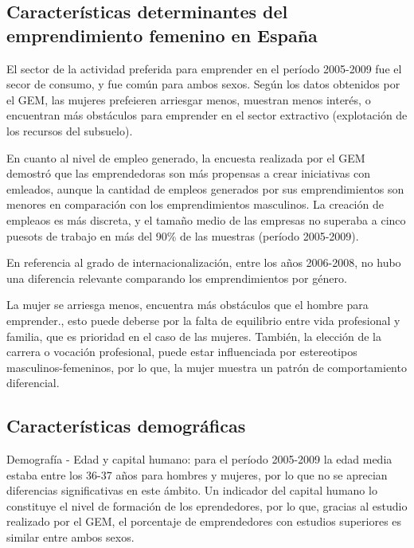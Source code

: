\documentclass[
  letterpaper,
  DIV=11,
  numbers=noendperiod]{scrreprt}
\begin{document}
\hypertarget{caracteruxedsticas-determinantes-del-emprendimiento-femenino-en-espauxf1a}{%
\subsection{Características determinantes del emprendimiento femenino en
España}\label{caracteruxedsticas-determinantes-del-emprendimiento-femenino-en-espauxf1a}}

El sector de la actividad preferida para emprender en el período
2005-2009 fue el secor de consumo, y fue común para ambos sexos. Según
los datos obtenidos por el GEM, las mujeres prefeieren arriesgar menos,
muestran menos interés, o encuentran más obstáculos para emprender en el
sector extractivo (explotación de los recursos del subsuelo).

En cuanto al nivel de empleo generado, la encuesta realizada por el GEM
demostró que las emprendedoras son más propensas a crear iniciativas con
emleados, aunque la cantidad de empleos generados por sus
emprendimientos son menores en comparación con los emprendimientos
masculinos. La creación de empleaos es más discreta, y el tamaño medio
de las empresas no superaba a cinco puesots de trabajo en más del 90\%
de las muestras (período 2005-2009).

En referencia al grado de internacionalización, entre los años
2006-2008, no hubo una diferencia relevante comparando los
emprendimientos por género.

La mujer se arriesga menos, encuentra más obstáculos que el hombre para
emprender., esto puede deberse por la falta de equilibrio entre vida
profesional y familia, que es prioridad en el caso de las mujeres.
También, la elección de la carrera o vocación profesional, puede estar
influenciada por estereotipos masculinos-femeninos, por lo que, la mujer
muestra un patrón de comportamiento diferencial.

\hypertarget{caracteruxedsticas-demogruxe1ficas}{%
\subsection{Características
demográficas}\label{caracteruxedsticas-demogruxe1ficas}}

Demografía - Edad y capital humano: para el período 2005-2009 la edad
media estaba entre los 36-37 años para hombres y mujeres, por lo que no
se aprecian diferencias significativas en este ámbito. Un indicador del
capital humano lo constituye el nivel de formación de los eprendedores,
por lo que, gracias al estudio realizado por el GEM, el porcentaje de
emprendedores con estudios superiores es similar entre ambos sexos.
\end{document}
